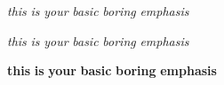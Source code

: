 {\itshape this} {\itshape is} {\itshape your} {\itshape basic} {\itshape boring} {\itshape emphasis}

{\itshape this} {\itshape is} {\itshape your} {\itshape basic} {\itshape boring} {\itshape emphasis}

{\bfseries{this}} {\bfseries{is}} {\bfseries{your}} {\bfseries{basic}} {\bfseries{boring}} {\bfseries{emphasis}} 